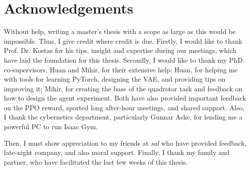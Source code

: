 \chapter*{Acknowledgements}

Without help, writing a master's thesis with a scope as large as this would be impossible. Thus, I give credit where credit is due.
Firstly, I would like to thank Prof. Dr. Kostas for his tips, insight and expertise during our meetings, which have laid the foundation for this thesis.
Secondly, I would like to thank my PhD. co-supervisors, Huan and Mihir, for their extensive help: Huan, for helping me with tools for learning PyTorch, designing the VAE, and providing tips on improving it; Mihir, for creating the base of the quadrotor task and feedback on how to design the agent experiment.
Both have also provided important feedback on the PPO reward, sported long after-hour meetings, and shared support.
Also, I thank the cybernetics department, particularly Gunnar Aske, for lending me a powerful PC to run Isaac Gym.

Then, I must show appreciation to my friends at \textit{sal} who have provided feedback, late-night company, and also moral support. Finally, I thank my family and partner, who have facilitated the last few weeks of this thesis.
